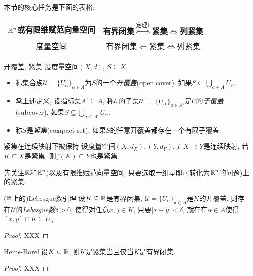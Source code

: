 本节的核心任务是下面的表格: 

\begin{table}[h]
	\centering
	\renewcommand\arraystretch{1.5}
	\begin{tabular}{|c|c|}
\hline
$\mathbb{R}^n$或有限维赋范向量空间 & 有界闭集$\stackrel{\textit{定理}1}{\Longleftrightarrow}$紧集$\Longleftrightarrow$列紧集 \\ \hline
度量空间             & 有界闭集$\Longleftarrow$紧集$\Longleftrightarrow$列紧集      \\ \hline
\end{tabular}
\end{table}

\begin{definition}{开覆盖, 紧集}
	设度量空间$(X,d)$, $S \subseteq X$. 
	\begin{itemize}
		\item 称集合族$\mathcal{U} = \{ U_{\alpha} \}_{\alpha \in A}$为$S$的一个\textit{开覆盖}(open cover), 如果$S \subseteq \bigcup_{\alpha \in A} U_{\alpha}$. 
		\item 承上述定义, 设指标集$A' \subseteq A$, 称$\mathcal{U}$的子集$\mathcal{U}'= \{ U_{\alpha} \}_{\alpha \in A'}$是$U$的\textit{子覆盖}(subcover), 如果$S \subseteq \bigcup_{\alpha \in A'} U_{\alpha}$. 
		\item 称$S$是\textit{紧集}(compact set), 如果$S$的任意开覆盖都存在一个有限子覆盖. 
	\end{itemize}
\end{definition}

\begin{lemma}{紧集在连续映射下被保持}
	设度量空间$(X,d_X),(Y,d_Y)$, $f:X \to Y$是连续映射, 若$K \subseteq X$是紧集, 则$f(K) \subseteq Y$也是紧集. 
\end{lemma}

先关注$\mathbb{R}$和$\mathbb{R} ^n$(以及有限维赋范向量空间, 只要选取一组基即可转化为$\mathbb{R} ^n$的问题)上的紧集. 

\begin{proposition}{($\mathbb{R}$上的)Lebesgue数引理}
	设$K \subseteq \mathbb{R}$是有界闭集, $\mathcal{U} = \{ U_{\alpha} \}_{\alpha \in A}$是$K$的开覆盖, 则存在$\mathcal{U}$的\textit{Lebesgue数}$\delta >0$, 使得对任意$x,y \in K$, 只要$|x-y|<\delta$, 就存在$\alpha \in A$使得$[x,y] \cap K \subseteq U_{\alpha}$. 
\end{proposition}
\begin{proof}
	XXX
\end{proof}

\begin{theorem}{Heine-Borel}
	设$K \subseteq \mathbb{R}$, 则$K$是紧集当且仅当$K$是有界闭集. 
\end{theorem}
\begin{proof}
	XXX
\end{proof}